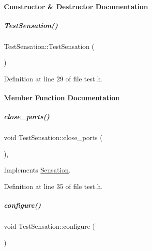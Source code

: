 \paragraph{Constructor \& Destructor Documentation}
\mbox{\label{group__sensationManager_a8ae3442345d6ef38860588c9f04a4632}} 
\subparagraph{\texorpdfstring{Test\+Sensation()}{TestSensation()}}
{\footnotesize\ttfamily Test\+Sensation\+::\+Test\+Sensation (\begin{DoxyParamCaption}{ }\end{DoxyParamCaption})\hspace{0.3cm}{\ttfamily [inline]}}



Definition at line 29 of file test.\+h.



\paragraph{Member Function Documentation}
\mbox{\label{group__sensationManager_adfca7f97bb5a9c16c172f43462a7b762}} 
\subparagraph{\texorpdfstring{close\+\_\+ports()}{close\_ports()}}
{\footnotesize\ttfamily void Test\+Sensation\+::close\+\_\+ports (\begin{DoxyParamCaption}{ }\end{DoxyParamCaption})\hspace{0.3cm}{\ttfamily [inline]}, {\ttfamily [virtual]}}



Implements \hyperlink{group__sensationManager_a432fd7cefc45b46a5b4316be787c8e4b}{Sensation}.



Definition at line 35 of file test.\+h.

\mbox{\label{group__sensationManager_aa09c7e493d895039e889bc7c3c92ee52}} 
\subparagraph{\texorpdfstring{configure()}{configure()}}
{\footnotesize\ttfamily void Test\+Sensation\+::configure (\begin{DoxyParamCaption}{ }\end{DoxyParamCaption})\hspace{0.3cm}{\ttfamily [virtual]}}



